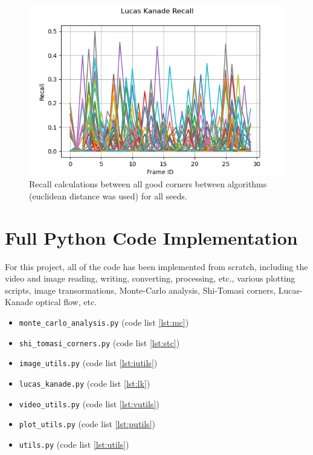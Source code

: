 \documentclass[11pt, conference, letterpaper]{IEEEtran}
\begin{document}
\begin{figure}[h]
    \centering
    \includegraphics[width=\linewidth]{mc_images/mc_lk_recall.png}
    \caption{Recall calculations between all good corners between algorithms (euclidean distance was used) for all seeds.}
    \label{fig:mc_lk_rec}
\end{figure}





\newpage

\onecolumn
\section{Full Python Code Implementation}
For this project, all of the code has been implemented from scratch, including the video and image reading, writing, converting, processing, etc., various plotting scripts, image transormations, Monte-Carlo analysis, Shi-Tomasi corners, Lucas-Kanade optical flow, etc.

\begin{itemize}
    \item \texttt{monte\_carlo\_analysis.py} (code list \ref{lst:mc})
    \item \texttt{shi\_tomasi\_corners.py} (code list \ref{lst:stc})
    \item \texttt{image\_utils.py} (code list \ref{lst:iutils})
    \item \texttt{lucas\_kanade.py} (code list \ref{lst:lk})
    \item \texttt{video\_utils.py} (code list \ref{lst:vutils})
    \item \texttt{plot\_utils.py} (code list \ref{lst:putils})
    \item \texttt{utils.py} (code list \ref{lst:utils})
\end{itemize}
\end{document}
